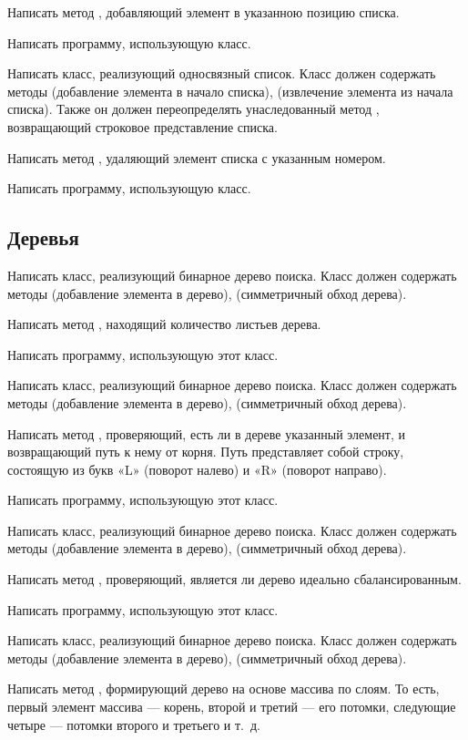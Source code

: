Написать метод , добавляющий элемент в указанною позицию
списка.

Написать программу, использующую класс.

\task Написать класс, реализующий односвязный список. Класс должен
содержать методы  (добавление элемента в начало списка),
 (извлечение элемента из начала списка). Также он должен
переопределять унаследованный метод , возвращающий
строковое представление списка.

Написать метод , удаляющий элемент списка с указанным
номером.

Написать программу, использующую класс.


\subsection{Деревья}

\task Написать класс, реализующий бинарное дерево поиска. Класс должен
содержать методы  (добавление элемента в дерево),
 (симметричный обход дерева).

Написать метод , находящий количество листьев дерева.

Написать программу, использующую этот класс.

\task Написать класс, реализующий бинарное дерево поиска. Класс должен
содержать методы  (добавление элемента в дерево),
 (симметричный обход дерева).

Написать метод , проверяющий, есть ли в дереве указанный
элемент, и возвращающий путь к нему от корня. Путь представляет собой
строку, состоящую из букв «L» (поворот налево) и «R» (поворот
направо).

Написать программу, использующую этот класс.

\task Написать класс, реализующий бинарное дерево поиска. Класс должен
содержать методы  (добавление элемента в дерево),
 (симметричный обход дерева).

Написать метод , проверяющий, является ли дерево
идеально сбалансированным.

Написать программу, использующую этот класс.

\task Написать класс, реализующий бинарное дерево поиска. Класс должен
содержать методы  (добавление элемента в дерево),
 (симметричный обход дерева).

Написать метод , формирующий дерево на основе массива
по слоям. То есть, первый элемент массива — корень, второй и третий —
его потомки, следующие четыре — потомки второго и третьего и т.~д.

